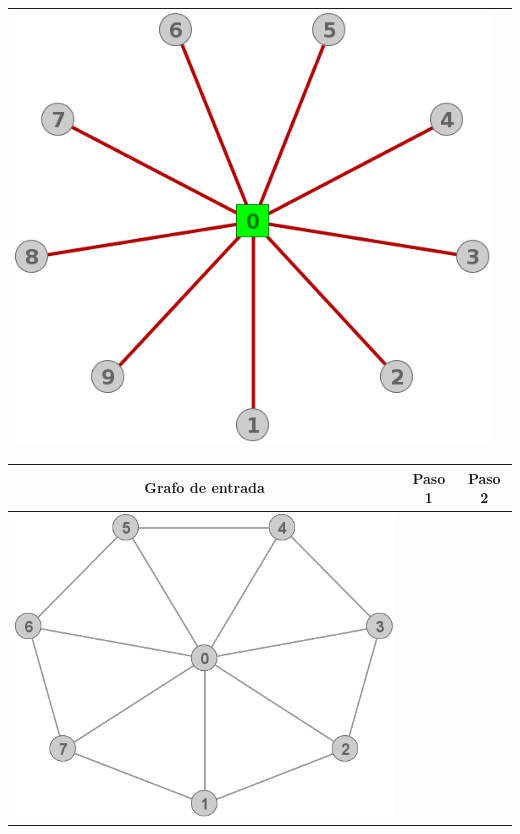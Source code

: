 \begin{center}
\begin{tabular}{ |c||c| }
			\includegraphics[scale = 0.25]{img/ej3/constructiva_golosa/Star_st1.png} \\
			\hline
		 \end{tabular}
		 \begin{tabular}{ |c||c||c| }
			\hline
			Grafo de entrada & Paso 1 & Paso 2 \\
			\hline\hline
			\includegraphics[scale = 0.25]{img/ej3/constructiva_golosa/Wheel_st0.png} &

\end{tabular}
\end{center}
